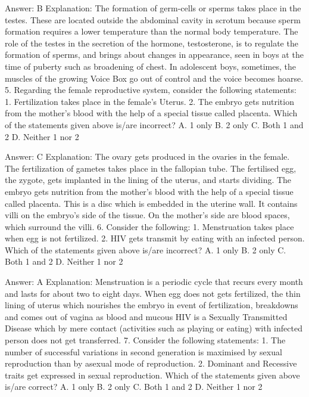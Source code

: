 Answer: B
Explanation: The formation of germ-cells or sperms takes place in the testes. These are located outside the abdominal cavity in scrotum because sperm formation requires a lower temperature than the normal body temperature. The role of the testes in the secretion of the hormone, testosterone, is to regulate the formation of sperms, and brings about changes in appearance, seen in boys at the time of puberty such as broadening of chest. In adolescent boys, sometimes, the muscles of the growing Voice Box go out of control and the voice becomes hoarse. 5. Regarding the female reproductive system, consider the following statements: 1. Fertilization takes place in the female's Uterus. 2. The embryo gets nutrition from the mother’s blood with the help of a special tissue called placenta. Which of the statements given above is/are incorrect? A. 1 only B. 2 only C. Both 1 and 2 D. Neither 1 nor 2 

Answer: C
Explanation: The ovary gets produced in the ovaries in the female. The fertilization of gametes takes place in the fallopian tube. The fertilised egg, the zygote, gets implanted in the lining of the uterus, and starts dividing. The embryo gets nutrition from the mother’s blood with the help of a special tissue called placenta. This is a disc which is embedded in the uterine wall. It contains villi on the embryo’s side of the tissue. On the mother’s side are blood spaces, which surround the villi. 6. Consider the following: 1. Menstruation takes place when egg is not fertilized. 2. HIV gets transmit by eating with an infected person. Which of the statements given above is/are incorrect? A. 1 only B. 2 only C. Both 1 and 2 D. Neither 1 nor 2 

Answer: A
Explanation: Menstruation is a periodic cycle that recurs every month and lasts for about two to eight days. When egg does not gets fertilized, the thin lining of uterus which nourishes the embryo in event of fertilization, breakdowns and comes out of vagina as blood and mucous HIV is a Sexually Transmitted Disease which by mere contact (activities such as playing or eating) with infected person does not get transferred. 7. Consider the following statements: 1. The number of successful variations in second generation is maximised by sexual reproduction than by asexual mode of reproduction. 2. Dominant and Recessive traits get expressed in sexual reproduction. Which of the statements given above is/are correct? A. 1 only B. 2 only C. Both 1 and 2 D. Neither 1 nor 2 

